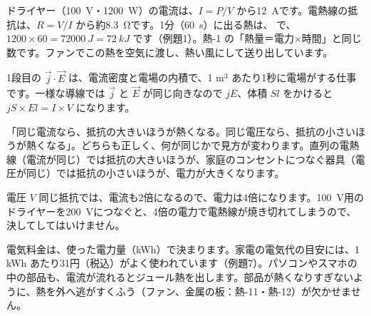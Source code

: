 \noindent ドライヤー（\qty{100}{V}・\qty{1200}{W}）の電流は、$I=P/V$ から\qty{12}{A}です。電熱線の抵抗は、$R=V/I$ から約\qty{8.3}{\ohm}です。1分（\qty{60}{s}）に出る熱は、
\label{ph:電-4:joule}で、$1200\times60=\qty{72000}{J}=\qty{72}{kJ}$ です（例題1）。熱-1 の「熱量＝電力×時間」と同じ数です。ファンでこの熱を空気に渡し、熱い風にして送り出しています。

\begin{phflow}[電場の仕事からジュール熱へ]
\end{phflow}

\noindent 1段目の $\vec j\cdot\vec E$ は、電流密度と電場の内積で、1 m$^3$ あたり1秒に電場がする仕事です。一様な導線では $\vec j$ と $\vec E$ が同じ向きなので $jE$、体積 $Sl$ をかけると $jS\times El=I\times V$ になります。

\begin{phyomi}[$P=RI^2$ と $P=\dfrac{V^2}{R}$]
「同じ電流なら、抵抗の大きいほうが熱くなる。同じ電圧なら、抵抗の小さいほうが熱くなる」。どちらも正しく、何が同じかで見方が変わります。直列の電熱線（電流が同じ）では抵抗の大きいほうが、家庭のコンセントにつなぐ器具（電圧が同じ）では抵抗の小さいほうが、電力が大きくなります。
\end{phyomi}

\begin{phbaisuru}{電圧 $V$}
同じ抵抗では、電流も2倍になるので、電力は4倍になります。\qty{100}{V}用のドライヤーを\qty{200}{V}につなぐと、4倍の電力で電熱線が焼き切れてしまうので、決してしてはいけません。
\end{phbaisuru}

\begin{phmijika}
電気料金は、使った電力量（kWh）で決まります。家電の電気代の目安には、1 kWh あたり31円（税込）がよく使われています（例題7）。パソコンやスマホの中の部品も、電流が流れるとジュール熱を出します。部品が熱くなりすぎないように、熱を外へ逃がすくふう（ファン、金属の板：熱-11・熱-12）が欠かせません。
\end{phmijika}

